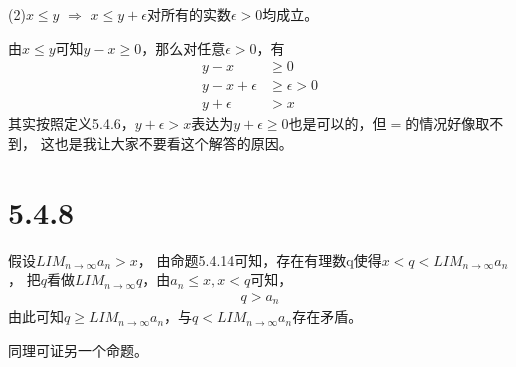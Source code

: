 \documentclass{article}
\theoremstyle{mystyle}
\begin{document}
(2)$x \leq y$ $\Rightarrow$ $x \leq y + \epsilon$对所有的实数$\epsilon > 0$均成立。

由$x \leq y$可知$y - x \geq 0$，那么对任意$\epsilon > 0$，有
\begin{align*}
  y - x            & \geq 0             \\
  y - x + \epsilon & \geq \epsilon  > 0 \\
  y + \epsilon     & > x
\end{align*}
其实按照定义5.4.6，$y + \epsilon > x$表达为$y + \epsilon \geq 0$也是可以的，但$=$的情况好像取不到，
这也是我让大家不要看这个解答的原因。

\section*{5.4.8}

假设$LIM_{n \rightarrow \infty}a_n > x$，
由命题5.4.14可知，存在有理数q使得$x < q < LIM_{n \rightarrow \infty}a_n$，
把$q$看做$LIM_{n \rightarrow \infty}q$，由$a_n \leq x, x < q$可知，
\begin{align*}
  q > a_n
\end{align*}
由此可知$q \geq LIM_{n \rightarrow \infty}a_n$，与$q < LIM_{n \rightarrow \infty}a_n$存在矛盾。

同理可证另一个命题。
\end{document}
